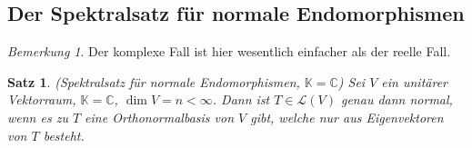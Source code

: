 \documentclass[12pt,a4paper]{article}
\newtheorem{theorem}{Satz}
\theoremstyle{definition}
\theoremstyle{remark}
\newtheorem*{remark}{Bemerkung}
\begin{document}
	\newpage	
	
 	\subsection{Der Spektralsatz für normale Endomorphismen}
	\begin{remark}
		Der komplexe Fall ist hier wesentlich einfacher als der reelle Fall.
	\end{remark}
	
	\begin{theorem}{(Spektralsatz für normale Endomorphismen, $\mathbb{K} = \mathbb{C}$)}
		Sei $V$ ein unitärer Vektorraum, $\mathbb{K} = \mathbb{C}$, $\dim V = n < \infty$. Dann ist $T \in \mathcal{L}(V)$ genau dann normal, wenn es zu $T$ eine Orthonormalbasis von $V$ gibt, welche nur aus Eigenvektoren von $T$ besteht.
	\end{theorem}
	
\end{document}
